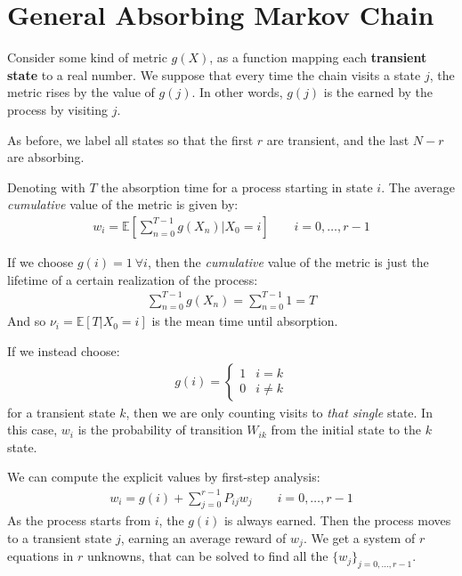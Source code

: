 \documentclass[../template.tex]{subfiles}
\begin{document}

\section{General Absorbing Markov Chain}
Consider some kind of metric $g(X)$, as a function mapping each \textbf{transient state} to a real number. We suppose that every time the chain visits a state $j$, the metric rises by the value of $g(j)$. In other words, $g(j)$ is the  earned by the process by visiting $j$.

As before, we label all states so that the first $r$ are transient, and the last $N-r$ are absorbing.

Denoting with $T$ the absorption time for a process starting in state $i$. The average \textit{cumulative} value of the metric is given by:
\begin{align*}
    w_i = \mathbb{E}\left[\sum_{n=0}^{T-1} g(X_n)|X_0=i\right] \qquad i=0, \dots, r-1
\end{align*}

If we choose $g(i) = 1\> \forall i$, then the \textit{cumulative} value of the metric is just the lifetime of a certain realization of the process:
\begin{align*}
    \sum_{n=0}^{T-1} g(X_n) = \sum_{n=0}^{T-1} 1 = T
\end{align*} 
And so $\nu_i = \mathbb{E}[T|X_0=i]$ is the mean time until absorption.

\medskip

If we instead choose:
\begin{align}
    g(i) = \begin{cases}
        1 & i = k\\
        0 & i \neq k
    \end{cases} 
    \label{eqn:gidelta}
\end{align}
for a transient state $k$, then we are only counting visits to \textit{that single} state. In this case, $w_i$ is the probability of transition $W_{ik}$ from the initial state to the $k$ state.

\medskip

We can compute  the explicit values by first-step analysis:
\begin{align}\label{eqn:systemwi}
    w_i = g(i) + \sum_{j=0}^{r-1} P_{ij} w_j \qquad i = 0, \dots, r-1
\end{align}
As the process starts from $i$, the  $g(i)$ is always earned. Then the process moves to a transient state $j$, earning an average reward of $w_j$. We get a system of $r$ equations in $r$ unknowns, that can be solved to find all the $\{w_j\}_{j=0,\dots,r-1}$.
\end{document}

